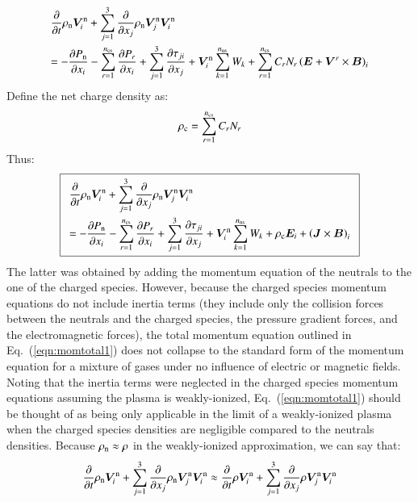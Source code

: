 \documentclass{warpdoc}
\newcommand\frameeqn[1]{\fbox{$\displaystyle #1$}}
\newcommand{\alb}{\vspace{0.1cm}\\} %
\newcommand{\mfd}{\displaystyle}
\newcommand{\nns}{{n_{\rm ns}}}
\newcommand{\ncs}{{n_{\rm cs}}}
\renewcommand{\vec}[1]{\bm{#1}}
\begin{document}
%
\begin{equation}
\begin{array}{l}\mfd
   \frac{\partial  }{\partial t}\rho_{\rm n} \vec{V}_i^{\rm n}
  + \sum_{j=1}^3  \frac{\partial }{\partial x_j}\rho_{\rm n} \vec{V}_j^{\rm n} \vec{V}_i^{\rm n}
\alb\mfd
=
-\frac{\partial P_{\rm n}}{\partial x_i} 
-\sum_{r=1}^\ncs \frac{\partial P_r}{\partial x_i} 
+ \sum_{j=1}^3 \frac{\partial \tau_{ji}}{\partial x_j}
+\vec{V}_i^{\rm n} \sum_{k=1}^\nns  W_k
+ \sum_{r=1}^\ncs C_r N_r \left(\vec{E}+\vec{V}^r \times \vec{B}\right)_i
\end{array}
\end{equation}
%
Define the net charge density as:
%
\begin{equation}
\rho_{\rm c}=\sum_{r=1}^\ncs C_r N_r
\end{equation}
%
Thus:
%
\begin{equation}
\frameeqn{
\begin{array}{l}\mfd
   \frac{\partial  }{\partial t}\rho_{\rm n} \vec{V}_i^{\rm n}
  + \sum_{j=1}^3  \frac{\partial }{\partial x_j}\rho_{\rm n} \vec{V}_j^{\rm n} \vec{V}_i^{\rm n}
\alb\mfd =
-\frac{\partial P_{\rm n}}{\partial x_i} 
-\sum_{r=1}^\ncs \frac{\partial P_r}{\partial x_i} 
+ \sum_{j=1}^3 \frac{\partial \tau_{ji}}{\partial x_j}
+\vec{V}_i^{\rm n} \sum_{k=1}^\nns  W_k
+ \rho_{\rm c} \vec{E}_i +\left(\vec{J} \times \vec{B}\right)_i
\end{array}
}
\label{eqn:momtotal1}
\end{equation}
%
The latter was obtained by adding the momentum equation of the neutrals to the one of the charged species. However, because the charged species momentum equations do not include inertia terms (they include only the collision forces between the neutrals and the charged species, the pressure gradient forces, and the electromagnetic forces), the total momentum equation outlined in Eq.\ (\ref{eqn:momtotal1}) does not collapse to the standard form of the momentum equation for a mixture of gases under no influence of electric or magnetic fields. Noting that the inertia terms were neglected in the charged species momentum equations assuming the plasma is weakly-ionized, Eq.\ (\ref{eqn:momtotal1}) should be thought of as being only applicable in the limit of a weakly-ionized plasma when the charged species densities are negligible compared to the neutrals densities. Because $\rho_{\rm n} \approx \rho$ in the weakly-ionized approximation, we can say that:
%
\begin{equation}
   \frac{\partial  }{\partial t}\rho_{\rm n} \vec{V}_i^{\rm n}
  + \sum_{j=1}^3  \frac{\partial }{\partial x_j}\rho_{\rm n} \vec{V}_j^{\rm n} \vec{V}_i^{\rm n}
\approx
   \frac{\partial  }{\partial t}\rho \vec{V}_i^{\rm n}
  + \sum_{j=1}^3  \frac{\partial }{\partial x_j}\rho \vec{V}_j^{\rm n} \vec{V}_i^{\rm n}  
\label{eqn:momtotal2}
\end{equation}
\end{document}
